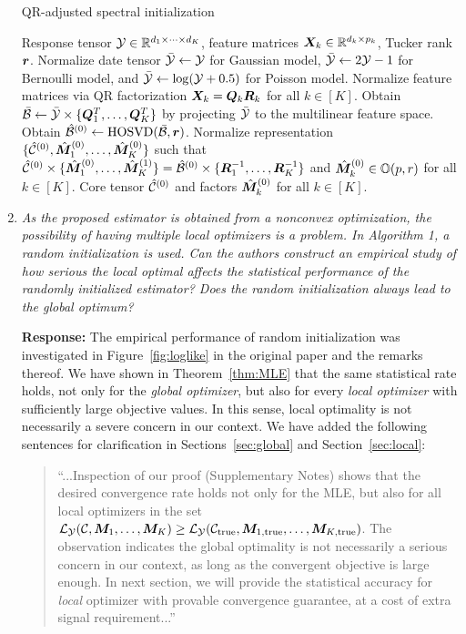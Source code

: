 \documentclass[11pt]{article}
\theoremstyle{plain}
\theoremstyle{definition}
\begin{document}
\begin{enumerate}[wide, labelwidth=!, labelindent=0pt]
\begin{algorithm}[!h]
\caption{QR-adjusted spectral initialization}\label{alg:A}
\begin{algorithmic}[1]
\INPUT Response tensor $\mathcal{Y}\in \mathbb{R}^{d_1\times \cdots \times d_K}$, feature matrices $\bm X_k\in\mathbb{R}^{d_k\times p_k}$, Tucker rank $\bm{r}$. 
\State Normalize date tensor $\bar {\mathcal{Y}}\leftarrow \mathcal{Y}$ for Gaussian model, $\bar {\mathcal{Y}}\leftarrow 2\mathcal{Y}-1$ for Bernoulli model, and $\bar {\mathcal{Y}}\leftarrow \log(\mathcal{Y}+0.5)$ for Poisson model. 
\State Normalize feature matrices via QR factorization $\bm X_k=\bm{Q}_k\bm{R}_k$ for all $k\in[K]$.
\State Obtain $\bar {\mathcal{B}} \leftarrow \bar {\mathcal{Y}}\times\{\bm{Q}^T_1,\ldots,\bm{Q}^T_K\}$ by projecting $\bar {\mathcal{Y}}$ to the multilinear feature space. 
\State Obtain $\hat{\mathcal{B}}^{(0)}\leftarrow \textup{HOSVD}(\bar {\mathcal{B}},\bm{r})$.
\State Normalize representation $\{\hat{\mathcal{C}}^{(0)}, \hat{\bm M}^{(0)}_1,\ldots,\hat{\bm M}^{(0)}_K\}$ such that $\hat{\mathcal{C}}^{(0)}\times\{ \hat{\bm M}^{(0)}_1,\ldots,\hat{\bm M}^{(1)}_K\} = \hat{\mathcal{B}}^{(0)}\times\{ \bm{R}^{-1}_1,\ldots,\bm{R}^{-1}_K\}$ and $\hat{\bm M}^{(0)}_k\in\mathbb{O}(p,r)$ for all $k\in[K]$.
\OUTPUT Core tensor $\hat{\mathcal{C}}^{(0)}$ and factors $\hat{\bm M}^{(0)}_k$ for all $k\in[K]$.
\end{algorithmic}
\end{algorithm}
    
    \item  \textit{As the proposed estimator is obtained from a nonconvex optimization, the possibility of having multiple local optimizers is a problem. In Algorithm 1, a random initialization is used. Can the authors construct an empirical study of how serious the local optimal affects the statistical performance of the randomly initialized estimator? Does the random initialization always lead to the global optimum?}
    
     \textbf{Response:} The empirical performance of random initialization was investigated in Figure~\ref{fig:loglike} in the original paper and the remarks thereof. We have shown in Theorem~\ref{thm:MLE} that the same statistical rate holds, not only for the {\it global optimizer}, but also for every {\it local optimizer} with sufficiently large objective values. In this sense, local optimality is not necessarily a severe concern in our context. We have added the following sentences for clarification in Sections~\ref{sec:global} and Section~\ref{sec:local}: 
     
     \begin{quote}
         ``...Inspection of our proof (Supplementary Notes) shows that the desired convergence rate holds not only for the MLE, but also for all local optimizers in the set $\mathcal{L}_{\mathcal{Y}}(\mathcal{C}, \bm M_1,\ldots,\bm M_K)\geq \mathcal{L}_{\mathcal{Y}} (\mathcal{C}_{\textup{true}},\bm M_{1,\textup{true}},\ldots,\bm M_{K,\textup{true}})$. The observation indicates the global optimality is not necessarily a serious concern in our context, as long as the convergent objective is large enough. In next section, we will provide the statistical accuracy for \emph{local} optimizer with provable convergence guarantee, at a cost of extra signal requirement...''
     \end{quote}
     

\end{enumerate}
\end{document}
